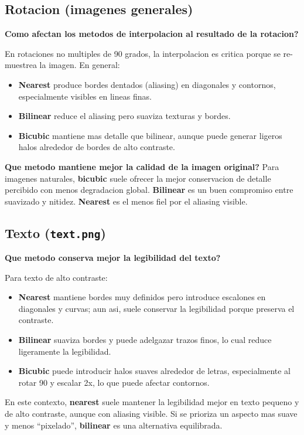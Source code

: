 \documentclass[11pt]{article}
\begin{document}
\subsection*{Rotacion (imagenes generales)}
\textbf{Como afectan los metodos de interpolacion al resultado de la rotacion?}

En rotaciones no multiples de 90 grados, la interpolacion es critica porque se
re-muestrea la imagen. En general:
\begin{itemize}
  \item \textbf{Nearest} produce bordes dentados (aliasing) en diagonales y
        contornos, especialmente visibles en lineas finas.
  \item \textbf{Bilinear} reduce el aliasing pero suaviza texturas y bordes.
  \item \textbf{Bicubic} mantiene mas detalle que bilinear, aunque puede generar
        ligeros halos alrededor de bordes de alto contraste.
\end{itemize}

\textbf{Que metodo mantiene mejor la calidad de la imagen original?}
Para imagenes naturales, \textbf{bicubic} suele ofrecer la mejor conservacion
de detalle percibido con menos degradacion global. \textbf{Bilinear} es un buen
compromiso entre suavizado y nitidez. \textbf{Nearest} es el menos fiel por el
aliasing visible.

\subsection*{Texto (\texttt{text.png})}
\textbf{Que metodo conserva mejor la legibilidad del texto?}

Para texto de alto contraste:
\begin{itemize}
  \item \textbf{Nearest} mantiene bordes muy definidos pero introduce escalones
        en diagonales y curvas; aun asi, suele conservar la legibilidad porque
        preserva el contraste.
  \item \textbf{Bilinear} suaviza bordes y puede adelgazar trazos finos, lo cual
        reduce ligeramente la legibilidad.
  \item \textbf{Bicubic} puede introducir halos suaves alrededor de letras,
        especialmente al rotar 90 y escalar 2x, lo que puede afectar contornos.
\end{itemize}

En este contexto, \textbf{nearest} suele mantener la legibilidad mejor en texto
pequeno y de alto contraste, aunque con aliasing visible. Si se prioriza un
aspecto mas suave y menos ``pixelado'', \textbf{bilinear} es una alternativa
equilibrada.
\end{document}
